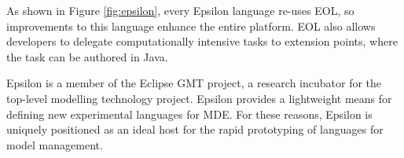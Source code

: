 As shown in Figure \ref{fig:epsilon}, every Epsilon language re-uses EOL, so improvements to this language enhance the entire platform. EOL also allows developers to delegate computationally intensive tasks to extension points, where the task can be authored in Java.

Epsilon is a member of the Eclipse GMT \cite{gmt} project, a research incubator for the top-level modelling technology project. Epsilon provides a lightweight means for defining new experimental languages for MDE. For these reasons, Epsilon is uniquely positioned as an ideal host for the rapid prototyping of languages for model management.